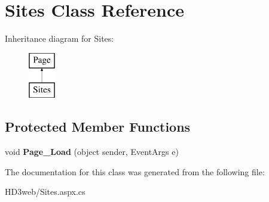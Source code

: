 \hypertarget{class_sites}{\section{Sites Class Reference}
\label{class_sites}
}
Inheritance diagram for Sites\+:\begin{figure}[H]
\begin{center}
\leavevmode
\includegraphics[height=2.000000cm]{class_sites}
\end{center}
\end{figure}
\subsection*{Protected Member Functions}
\begin{DoxyCompactItemize}
\item 
\hypertarget{class_sites_a3813c5de6d1f0499083db605115d464c}{void {\bfseries Page\+\_\+\+Load} (object sender, Event\+Args e)}\label{class_sites_a3813c5de6d1f0499083db605115d464c}

\end{DoxyCompactItemize}


The documentation for this class was generated from the following file\+:\begin{DoxyCompactItemize}
\item 
H\+D3web/Sites.\+aspx.\+cs\end{DoxyCompactItemize}
